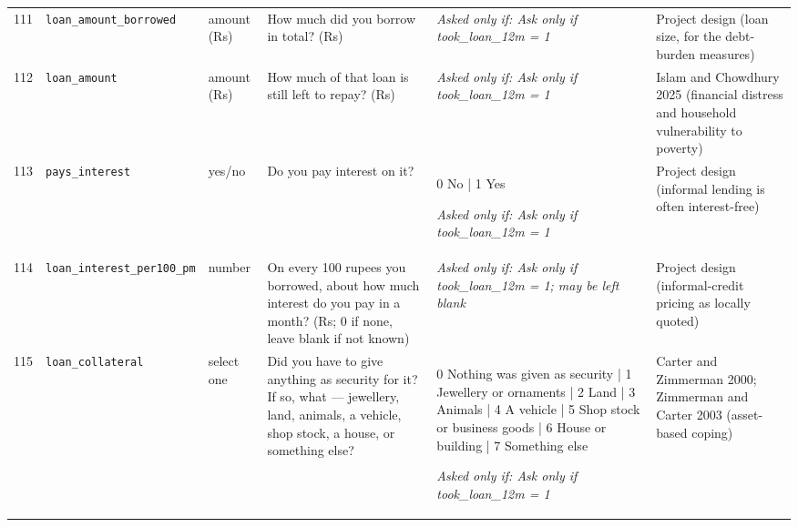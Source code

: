 \documentclass[9pt,a4paper,landscape]{article}
\begin{document}
\begin{longtable}{@{}p{0.5cm}p{3.3cm}p{1.7cm}p{7.3cm}p{5.6cm}p{5.4cm}@{}}
\footnotesize 111 & \footnotesize\texttt{loan\_amount\_borrowed} & \scriptsize amount (Rs) & \footnotesize How much did you borrow in total? (Rs)\par\vspace{1pt}{\footnotesize\color{hdr}{\hifont आपने कुल कितना क़र्ज़ लिया था? (रुपये)}} & \scriptsize \textit{Asked only if: Ask only if took\_loan\_12m = 1} & \scriptsize Project design (loan size, for the debt-burden measures)\\
\footnotesize 112 & \footnotesize\texttt{loan\_amount} & \scriptsize amount (Rs) & \footnotesize How much of that loan is still left to repay? (Rs)\par\vspace{1pt}{\footnotesize\color{hdr}{\hifont उस क़र्ज़ में से अब भी कितना चुकाना बाक़ी है? (रुपये)}} & \scriptsize \textit{Asked only if: Ask only if took\_loan\_12m = 1} & \scriptsize Islam and Chowdhury 2025 (financial distress and household vulnerability to poverty)\\
\footnotesize 113 & \footnotesize\texttt{pays\_interest} & \scriptsize yes/no & \footnotesize Do you pay interest on it?\par\vspace{1pt}{\footnotesize\color{hdr}{\hifont क्या आप उस पर ब्याज देते हैं?}} & \scriptsize 0 No | 1 Yes\par\vspace{1pt}\textit{Asked only if: Ask only if took\_loan\_12m = 1} & \scriptsize Project design (informal lending is often interest-free)\\
\footnotesize 114 & \footnotesize\texttt{loan\_interest\_per100\_pm} & \scriptsize number & \footnotesize On every 100 rupees you borrowed, about how much interest do you pay in a month? (Rs; 0 if none, leave blank if not known)\par\vspace{1pt}{\footnotesize\color{hdr}{\hifont आपने जो 100 रुपये उधार लिए, उन पर महीने का कितना ब्याज देते हैं? (रुपये; दर पता न हो तो खाली छोड़ दें)}} & \scriptsize \textit{Asked only if: Ask only if took\_loan\_12m = 1; may be left blank} & \scriptsize Project design (informal-credit pricing as locally quoted)\\
\footnotesize 115 & \footnotesize\texttt{loan\_collateral} & \scriptsize select one & \footnotesize Did you have to give anything as security for it? If so, what — jewellery, land, animals, a vehicle, shop stock, a house, or something else?\par\vspace{1pt}{\footnotesize\color{hdr}{\hifont आपको क्या गिरवी रखना पड़ा?}} & \scriptsize 0 Nothing was given as security | 1 Jewellery or ornaments | 2 Land | 3 Animals | 4 A vehicle | 5 Shop stock or business goods | 6 House or building | 7 Something else\par\vspace{1pt}\textit{Asked only if: Ask only if took\_loan\_12m = 1} & \scriptsize Carter and Zimmerman 2000; Zimmerman and Carter 2003 (asset-based coping)\\

\end{longtable}
\end{document}

